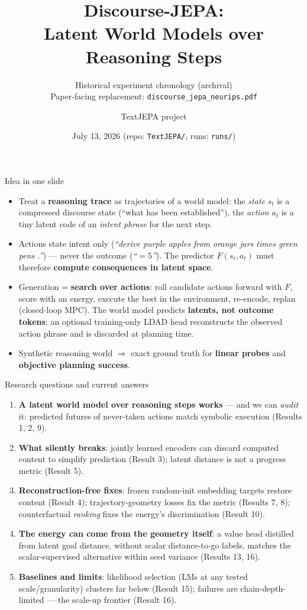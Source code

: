 \documentclass[aspectratio=169,10pt]{beamer}
\title{Discourse-JEPA:\\ Latent World Models over Reasoning Steps}
\subtitle{Historical experiment chronology (archival)\\
Paper-facing replacement: \texttt{discourse\_jepa\_neurips.pdf}}
\author{TextJEPA project}
\date{July 13, 2026 \quad (repo: \texttt{TextJEPA/}, runs: \texttt{runs/})}
\begin{document}
\frame{\titlepage}

\begin{frame}{Idea in one slide}
\begin{itemize}
  \item Treat a \textbf{reasoning trace} as trajectories of a world model: the
        \emph{state} $s_t$ is a compressed discourse state (``what has been
        established''), the \emph{action} $a_t$ is a tiny latent code of an
        \emph{intent phrase} for the next step.
  \item Actions state intent only (\emph{``derive purple apples from orange
        jars times green pens .''}) --- never the outcome (\emph{``$=5$''}).
        The predictor $F(s_t,a_t)$ must therefore \textbf{compute consequences
        in latent space}.
  \item Generation = \textbf{search over actions}: roll candidate actions
        forward with $F$, score with an energy, execute the best in the
        environment, re-encode, replan (closed-loop MPC). The world model
        predicts \textbf{latents, not outcome tokens}; an optional training-only
        LDAD head reconstructs the observed action phrase and is discarded at
        planning time.
  \item Synthetic reasoning world $\Rightarrow$ exact ground truth for
        \textbf{linear probes} and \textbf{objective planning success}.
\end{itemize}
\end{frame}

\begin{frame}{Research questions and current answers}
\begin{enumerate}\itemsep4pt
  \item \textbf{A latent world model over reasoning steps works} --- and we
        can \emph{audit} it: predicted futures of never-taken actions match
        symbolic execution (Results 1, 2, 9).
  \item \textbf{What silently breaks}: jointly learned encoders can discard
        computed content to simplify prediction (Result 3); latent distance is not
        a progress metric (Result 5).
  \item \textbf{Reconstruction-free fixes}: frozen random-init embedding
        targets restore content (Result 4); trajectory-geometry losses fix
        the metric (Results 7, 8); counterfactual \emph{ranking} fixes the
        energy's discrimination (Result 10).
  \item \textbf{The energy can come from the geometry itself}: a value head
        distilled from latent goal distance, without scalar distance-to-go
        labels, matches the scalar-supervised alternative within seed variance
        (Results 13, 16).
  \item \textbf{Baselines and limits}: likelihood selection (LMs at any
        tested scale/granularity) clusters far below (Result 15); failures
        are chain-depth-limited --- the scale-up frontier (Result 16).
\end{enumerate}
\end{frame}
\end{document}
